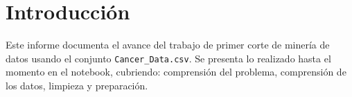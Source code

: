 \section{Introducci\'on}
Este informe documenta el avance del trabajo de primer corte de miner\'ia de datos usando el conjunto \texttt{Cancer\_Data.csv}. Se presenta lo realizado hasta el momento en el notebook, cubriendo: comprensi\'on del problema, comprensi\'on de los datos, limpieza y preparaci\'on.
